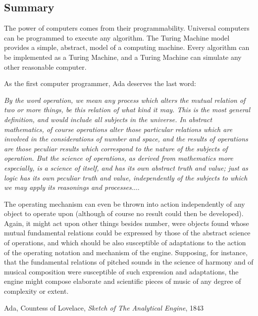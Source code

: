 \begin{schemeregion}
\section{Summary}

The power of computers comes from their programmability.  Universal computers can be programmed to execute any algorithm.  The Turing Machine model provides a simple, abstract, model of a computing machine.  Every algorithm can be implemented as a Turing Machine, and a Turing Machine can simulate any other reasonable computer.

As the first computer programmer, Ada deserves the last word:
\begin{smallquote}{\em
By the word operation, we mean any process which alters the mutual relation of two or more things, be this relation of what kind it may. This is the most general definition, and would include all subjects in the universe. In abstract mathematics, of course operations alter those particular relations which are involved in the considerations of number and space, and the results of operations are those peculiar results which correspond to the nature of the subjects of operation. But the science of operations, as derived from mathematics more especially, is a science of itself, and has its own abstract truth and value; just as logic has its own peculiar truth and value, independently of the subjects to which we may apply its reasonings and processes.$\ldots$

The operating mechanism can even be thrown into action independently of any object to operate upon (although of course no result could then be developed). Again, it might act upon other things besides number, were objects found whose mutual fundamental relations could be expressed by those of the abstract science of operations, and which should be also susceptible of adaptations to the action of the operating notation and mechanism of the engine. Supposing, for instance, that the fundamental relations of pitched sounds in the science of harmony and of musical composition were susceptible of such expression and adaptations, the engine might compose elaborate and scientific pieces of music of any degree of complexity or extent. }

\raggedleft Ada, Countess of Lovelace, \emph{Sketch of The Analytical Engine},  1843 %
\end{smallquote} 

\end{schemeregion}
